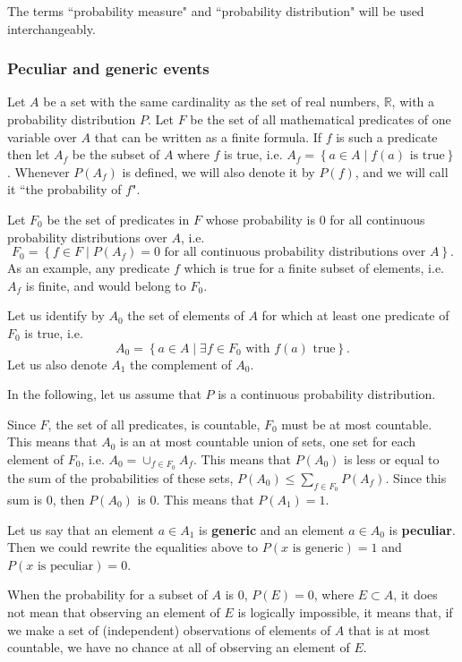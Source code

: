 \documentclass[a4paper
,draft
]{article}
\def\reale{\mathbb{R}}
\newcommand{\multime}[1]{\left\{ #1 \right\}}
\newcommand{\definitie}[1]{\textbf{#1}}
\newcommand{\ghilimele}[1]{``#1"}
\begin{document}
The terms \ghilimele{probability measure} and
\ghilimele{probability distribution} will be used interchangeably.

\subsubsection{Peculiar and generic events}

Let $A$ be a set with the same cardinality as the set of real numbers, $\reale$,
with a probability distribution $P$.
Let $F$ be the set of
all mathematical predicates of one variable over $A$ that can be written as a
finite formula.
If $f$ is such a predicate then let $A_f$ be the subset of
$A$ where $f$ is true, i.e. $A_f=\multime{a\in A\mid f(a) \mbox{ is true}}$.
Whenever $P(A_f)$ is defined, we will also denote it by $P(f)$, and we will
call it \ghilimele{the probability of $f$}.

Let $F_0$ be the set of predicates in $F$ whose probability is
$0$ for all continuous probability distributions over $A$, i.e.
$$F_0=\multime{
  f\in F
  \mid P(A_f)=0
    \mbox{ for all continuous probability distributions over } A}.
$$
As an example, any predicate $f$ which is true for a finite subset of elements,
i.e. $A_f$ is finite, and would belong to $F_0$.

Let us identify by $A_0$ the
set of elements of $A$ for which at least one predicate of $F_0$ is true, i.e.
$$A_0=\multime{a \in A\mid \exists f\in F_0 \mbox{ with } f(a)\mbox{ true} }.$$
Let us also denote $A_1$ the complement of $A_0$.

In the following, let us assume that $P$ is a continuous probability distribution.

Since $F$, the set of all predicates, is countable, $F_0$ must be at most
countable.
This means that $A_0$ is an at most countable union of sets, one set for each
element of $F_0$, i.e. $A_0=\cup_{f\in F_0} A_f$.
This means that $P(A_0)$ is less or equal to the sum of the probabilities of
these sets, $P(A_0)\le\sum_{f\in F_0} P(A_f)$.
Since this sum is $0$, then $P(A_0)$ is $0$.
This means that $P(A_1)=1$.

Let us say that an element $a\in A_1$ is \definitie{generic}
and an element $a\in A_0$ is \definitie{peculiar}. Then we could rewrite
the equalities above to $P(x\mbox{ is generic}) = 1$ and
$P(x\mbox{ is peculiar}) = 0$.

When the probability for a subset of $A$ is $0$, $P(E)=0$, where $E\subset A$,
it does not mean that observing an element of $E$ is logically impossible,
it means that,
if we make a set of (independent) observations of elements of $A$
that is at most countable, we have no chance at all of observing an element of
$E$.
\end{document}
